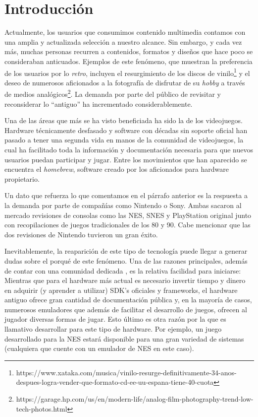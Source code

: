 \chapter{Introducción}
Actualmente, los usuarios que consumimos contenido multimedia contamos con una amplia y actualizada selección a nuestro alcance. Sin embargo, y cada vez más, muchas personas recurren a contenidos, formatos y diseños que hace poco se consideraban anticuados. Ejemplos de este fenómeno, que muestran la preferencia de los usuarios por lo \textit{retro}, incluyen el resurgimiento de los discos de vinilo\footnote{https://www.xataka.com/musica/vinilo-resurge-definitivamente-34-anos-despues-logra-vender-que-formato-cd-ee-uu-espana-tiene-40-cuota} y el deseo de numerosos aficionados a la fotografía de disfrutar de su {\it hobby} a través de medios analógicos\footnote{https://garage.hp.com/us/en/modern-life/analog-film-photography-trend-low-tech-photos.html}. La demanda por parte del público de revisitar y reconsiderar lo ``antiguo'' ha incrementado considerablemente. 

Una de las áreas que más se ha visto beneficiada ha sido la de los videojuegos. Hardware técnicamente desfasado y software con décadas sin soporte oficial han pasado a tener una segunda vida en manos de la comunidad de videojuegos, la cual ha facilitado toda la información y documentación necesaria para que nuevos usuarios puedan participar y jugar. Entre los movimientos que han aparecido se encuentra el {\it homebrew}, software creado por los aficionados para hardware propietario.

Un dato que refuerza lo que comentamos en el párrafo anterior es la respuesta a la demanda por parte de compañías como Nintendo o Sony. Ambas sacaron al mercado revisiones de consolas como las NES, SNES y PlayStation original junto con recopilaciones de juegos tradicionales de los 80 y 90. Cabe mencionar que las dos revisiones de Nintendo tuvieron un gran éxito.

Inevitablemente, la reaparición de este tipo de tecnología puede llegar a generar dudas sobre el porqué de este fenómeno. Una de las razones principales, además de contar con una comunidad dedicada \cite{bib:paper3}, es la relativa facilidad para iniciarse: Mientras que para el hardware más actual es necesario invertir tiempo y dinero en adquirir (y aprender a utilizar) SDK's oficiales y frameworks, el hardware antiguo ofrece gran cantidad de documentación pública y, en la mayoría de casos, numerosos emuladores que además de facilitar el desarrollo de juegos, ofrecen al jugador diversas formas de jugar. Esto último es otra razón por la que es llamativo desarrollar para este tipo de hardware. Por ejemplo, un juego desarrollado para la NES estará disponible para una gran variedad de sistemas (cualquiera que cuente con un emulador de NES en este caso).

